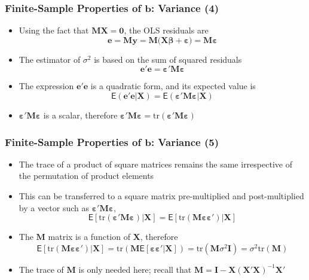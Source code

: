 \documentclass[10pt]{beamer}
\newcommand{\E}{\mathsf{E}}
\newcommand{\tr}{\mathrm{tr}}
\theoremstyle{definition}
\begin{document}
\begin{frame}[fragile]
\frametitle{Finite-Sample Properties of $\mathbf{b}$: Variance (4)}
\begin{itemize}
	\item Using the fact that $\mathbf{MX = 0}$, the OLS residuals are
	\[
		\mathbf{e = My = M(X}\boldsymbol\beta + \boldsymbol\varepsilon) = \mathbf{M}\boldsymbol\varepsilon
	\]
	\item The estimator of $\sigma^{2}$ is based on the sum of squared residuals
	\[
		\mathbf{e'e} = \boldsymbol\varepsilon'\mathbf{M}\boldsymbol\varepsilon
	\]
	\item The expression $\mathbf{e'e}$ is a quadratic form, and its expected value is
	\[
		\E(\mathbf{e'e}|\mathbf{X}) = \E(\boldsymbol\varepsilon'\mathbf{M}\boldsymbol\varepsilon|\mathbf{X})
	\]
	\item $ \boldsymbol\varepsilon'\mathbf{M}\boldsymbol\varepsilon $ is a scalar, therefore $ \boldsymbol\varepsilon'\mathbf{M}\boldsymbol\varepsilon  = \tr(\boldsymbol\varepsilon'\mathbf{M}\boldsymbol\varepsilon )$
\end{itemize}
\end{frame}

\begin{frame}[fragile]
\frametitle{Finite-Sample Properties of $\mathbf{b}$: Variance (5)}
\begin{itemize}
	\item The trace of a product of square matrices remains the same irrespective of the permutation of product elements
	\item This can be transferred to a square matrix pre-multiplied and post-multiplied by a vector such as $ \boldsymbol\varepsilon'\mathbf{M}\boldsymbol\varepsilon $, 
	\[
		\E[\tr(\boldsymbol\varepsilon'\mathbf{M}\boldsymbol\varepsilon)|\mathbf{X}] = \E[\tr(\mathbf{M}\boldsymbol\varepsilon\boldsymbol\varepsilon')|\mathbf{X}]
	\]
	\item The $ \mathbf{M} $ matrix is a function of $ \mathbf{X} $, therefore
	\[
		\E[\tr(\mathbf{M}\boldsymbol\varepsilon\boldsymbol\varepsilon')|\mathbf{X}] = \tr(\mathbf{M}\E[\boldsymbol\varepsilon\boldsymbol\varepsilon'|\mathbf{X}]) = \tr(\mathbf{M}\sigma^{2}\mathbf{I}) = \sigma^{2}\tr(\mathbf{M})
	\]
	\item The trace of $ \mathbf{M} $ is only needed here; recall that $ \mathbf{M = I - X(X'X)}^{-1}\mathbf{X'} $
\end{itemize}
\end{frame}
\end{document}
